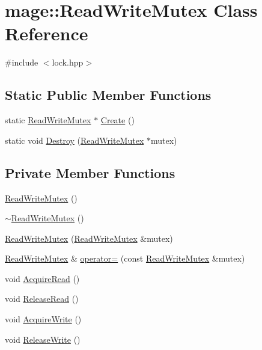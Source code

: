 \hypertarget{classmage_1_1_read_write_mutex}{}\section{mage\+:\+:Read\+Write\+Mutex Class Reference}
\label{classmage_1_1_read_write_mutex}


{\ttfamily \#include $<$lock.\+hpp$>$}

\subsection*{Static Public Member Functions}
\begin{DoxyCompactItemize}
\item 
static \hyperlink{classmage_1_1_read_write_mutex}{Read\+Write\+Mutex} $\ast$ \hyperlink{classmage_1_1_read_write_mutex_ad184ba46c44446b5ebe1026801fcac9b}{Create} ()
\item 
static void \hyperlink{classmage_1_1_read_write_mutex_a879992fe8bf7fc81df9fa5ffa1c380a3}{Destroy} (\hyperlink{classmage_1_1_read_write_mutex}{Read\+Write\+Mutex} $\ast$mutex)
\end{DoxyCompactItemize}
\subsection*{Private Member Functions}
\begin{DoxyCompactItemize}
\item 
\hyperlink{classmage_1_1_read_write_mutex_aae10694de3862f2d1059477169883940}{Read\+Write\+Mutex} ()
\item 
\hyperlink{classmage_1_1_read_write_mutex_a73676d9414658d63edfe443ee1d55c8b}{$\sim$\+Read\+Write\+Mutex} ()
\item 
\hyperlink{classmage_1_1_read_write_mutex_ae58b656dabbee6ccad6d0d89b85bf018}{Read\+Write\+Mutex} (\hyperlink{classmage_1_1_read_write_mutex}{Read\+Write\+Mutex} \&mutex)
\item 
\hyperlink{classmage_1_1_read_write_mutex}{Read\+Write\+Mutex} \& \hyperlink{classmage_1_1_read_write_mutex_a3fab1becc4527dc69fdd6cd38b627501}{operator=} (const \hyperlink{classmage_1_1_read_write_mutex}{Read\+Write\+Mutex} \&mutex)
\item 
void \hyperlink{classmage_1_1_read_write_mutex_af78045647078aaf3966c8f1b06e35c92}{Acquire\+Read} ()
\item 
void \hyperlink{classmage_1_1_read_write_mutex_a0af5059a9bd16abd8a21b15e7ebe053d}{Release\+Read} ()
\item 
void \hyperlink{classmage_1_1_read_write_mutex_a76137013107a9c2c1fc05c1e0747965e}{Acquire\+Write} ()
\item 
void \hyperlink{classmage_1_1_read_write_mutex_ad0fd296bdaa212f54a58372c8dfe1d1d}{Release\+Write} ()
\end{DoxyCompactItemize}
